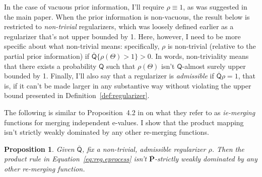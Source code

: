 \documentclass[a4paper, 12pt]{article}
\theoremstyle{plain}
\newtheorem{prop}{Proposition}
\theoremstyle{definition}
\theoremstyle{remark}
\newcommand{\prior}{\mathsf{Q}}
\newcommand{\uprior}{\overline{\mathsf{Q}}}
\newcommand{\uuprob}{\mathbf{\overline{P}}}
\begin{document}
In the case of vacuous prior information, I'll require $\rho \equiv 1$, as was suggested in the main paper.  When the prior information is non-vacuous, the result below is restricted to {\em non-trivial} regularizers, which was loosely defined earlier as a regularizer that's not upper bounded by 1.  Here, however, I need to be more specific about what non-trivial means: specifically, $\rho$ is non-trivial (relative to the partial prior information) if $\uprior\{ \rho(\Theta) > 1 \} > 0$.  In words, non-triviality means that there exists a probability $\prior$ such that $\rho(\Theta)$ isn't $\prior$-almost surely upper bounded by 1. Finally, I'll also say that a regularizer is {\em admissible} if $\uprior\rho=1$, that is, if it can't be made larger in any substantive way without violating the upper bound presented in Definition~\ref{def:regularizer}. 

The following is similar to Proposition~4.2 in \citet{vovk.wang.2021} on what they refer to as {\em ie-merging} functions for merging independent e-values.  I show that the product mapping isn't strictly weakly dominated by any other re-merging functions.  

\begin{prop}
\label{prop:dominates}
Given $\uprior$, fix a non-trivial, admissible regularizer $\rho$.  Then the product rule in Equation~\eqref{eq:reg.eprocess} isn't $\uuprob$-strictly weakly dominated by any other re-merging function. 
\end{prop}
\end{document}
